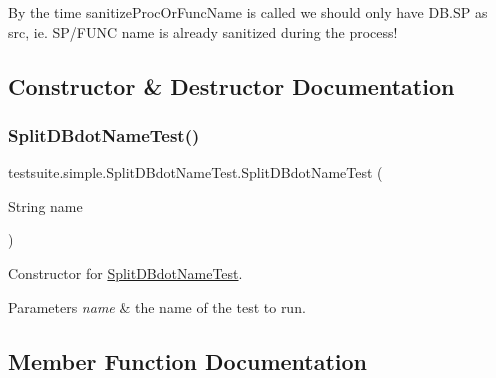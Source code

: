 By the time sanitize\+Proc\+Or\+Func\+Name is called we should only have D\+B.\+SP as src, ie. S\+P/\+F\+U\+NC name is already sanitized during the process! 

\subsection{Constructor \& Destructor Documentation}
\mbox{\label{classtestsuite_1_1simple_1_1_split_d_bdot_name_test_ac0705ebb305a60c8c7e932f358c79039}} 
\subsubsection{\texorpdfstring{Split\+D\+Bdot\+Name\+Test()}{SplitDBdotNameTest()}}
{\footnotesize\ttfamily testsuite.\+simple.\+Split\+D\+Bdot\+Name\+Test.\+Split\+D\+Bdot\+Name\+Test (\begin{DoxyParamCaption}\item[{String}]{name }\end{DoxyParamCaption})}

Constructor for \mbox{\hyperlink{classtestsuite_1_1simple_1_1_split_d_bdot_name_test}{Split\+D\+Bdot\+Name\+Test}}.


\begin{DoxyParams}{Parameters}
{\em name} & the name of the test to run. \\
\hline
\end{DoxyParams}


\subsection{Member Function Documentation}
\mbox{\label{classtestsuite_1_1simple_1_1_split_d_bdot_name_test_acb8ba7fcbc46d143cfda1afb2530249b}} 
